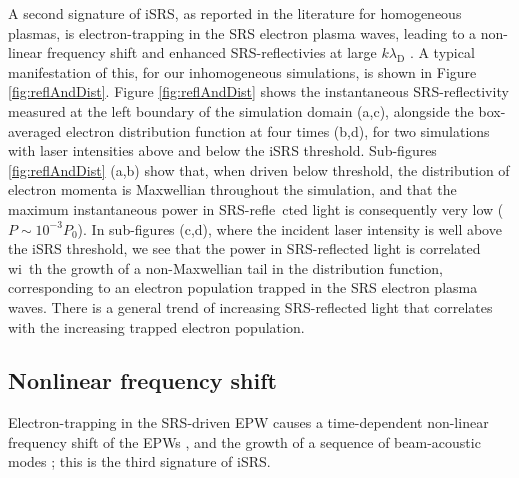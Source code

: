 A second signature of iSRS, as reported in the literature for homogeneous plasmas, is electron-trapping in the SRS electron plasma waves, leading to a
non-linear frequency shift and enhanced SRS-reflectivies at large $k\lambda_\mathrm{D}$ \citep{Vu2002}.
A typical manifestation of this, for our inhomogeneous simulations, is shown in Figure \ref{fig:reflAndDist}. Figure \ref{fig:reflAndDist}
shows the instantaneous SRS-reflectivity measured at the left boundary of the simulation domain (a,c), alongside the box-averaged electron
distribution function at four times (b,d), for two simulations with laser intensities above and below the iSRS threshold.
Sub-figures \ref{fig:reflAndDist} (a,b) show that, when driven below threshold, the distribution of electron momenta is Maxwellian throughout the simulation, and that the maximum instantaneous power in SRS-refle\
cted light is consequently very low ($P \sim 10^{-3}P_0$). In sub-figures (c,d), where the incident laser intensity is well above the iSRS threshold, we see that the power in SRS-reflected light is correlated wi\
th the growth of a non-Maxwellian tail in the distribution function, corresponding to an electron population trapped in the SRS electron plasma waves.
There is a general trend of increasing SRS-reflected light that correlates with
the increasing trapped electron population.


\subsection{Nonlinear frequency shift}
Electron-trapping in the SRS-driven EPW causes a time-dependent non-linear frequency shift of
the EPWs \citep{Morales1972,Kline2006}, and the growth of a sequence of beam-acoustic modes \citep{Yin2006}; this is the third signature of iSRS.

